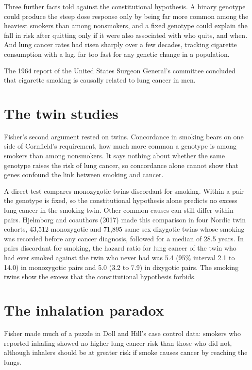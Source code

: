 Three further facts told against the constitutional hypothesis. A binary genotype could produce the steep dose response only by being far more common among the heaviest smokers than among nonsmokers, and a fixed genotype could explain the fall in risk after quitting only if it were also associated with who quits, and when. And lung cancer rates had risen sharply over a few decades, tracking cigarette consumption with a lag, far too fast for any genetic change in a population.

The 1964 report of the United States Surgeon General's committee concluded that cigarette smoking is causally related to lung cancer in men. 

\section{The twin studies}

Fisher's second argument rested on twins. Concordance in smoking bears on one side of Cornfield's requirement, how much more common a genotype is among smokers than among nonsmokers. It says nothing about whether the same genotype raises the risk of lung cancer, so concordance alone cannot show that genes confound the link between smoking and cancer.

A direct test compares monozygotic twins discordant for smoking. Within a pair the genotype is fixed, so the constitutional hypothesis alone predicts no excess lung cancer in the smoking twin. Other common causes can still differ within pairs. Hjelmborg and coauthors (2017) made this comparison in four Nordic twin cohorts, 43,512 monozygotic and 71,895 same sex dizygotic twins whose smoking was recorded before any cancer diagnosis, followed for a median of 28.5 years. In pairs discordant for smoking, the hazard ratio for lung cancer of the twin who had ever smoked against the twin who never had was 5.4 (95\% interval 2.1 to 14.0) in monozygotic pairs and 5.0 (3.2 to 7.9) in dizygotic pairs. The smoking twins show the excess that the constitutional hypothesis forbids.

\section{The inhalation paradox}

Fisher made much of a puzzle in Doll and Hill's case control data: smokers who reported inhaling showed no higher lung cancer risk than those who did not, although inhalers should be at greater risk if smoke causes cancer by reaching the lungs.

